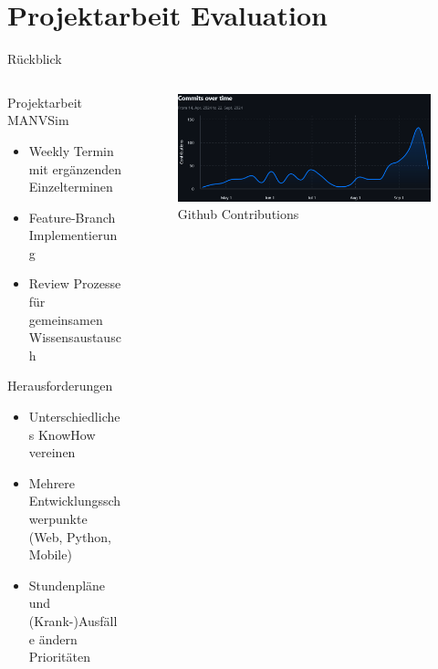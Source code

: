 \section{Projektarbeit Evaluation}

\begin{frame}{Rückblick}
	\begin{columns}
		\begin{column}{0.5\textwidth}
			Projektarbeit MANVSim 
			\begin{itemize}
				\item Weekly Termin mit ergänzenden Einzelterminen
				\item Feature-Branch Implementierung
				\item Review Prozesse für gemeinsamen Wissensaustausch
			\end{itemize}
			Herausforderungen
			\begin{itemize}
				\item Unterschiedliches KnowHow vereinen
				\item Mehrere Entwicklungsschwerpunkte (Web, Python, Mobile)
				\item Stundenpläne und (Krank-)Ausfälle ändern Prioritäten
			\end{itemize}
		\end{column}
		\begin{column}{0.5\textwidth}
			\begin{figure}
				\begin{center}
					\includegraphics[height=0.4\textheight]{images/Commits_over_time.png}
				\end{center}
				\caption{Github Contributions}\label{fig:übung}
			\end{figure}
		\end{column}
	\end{columns}
\end{frame}
